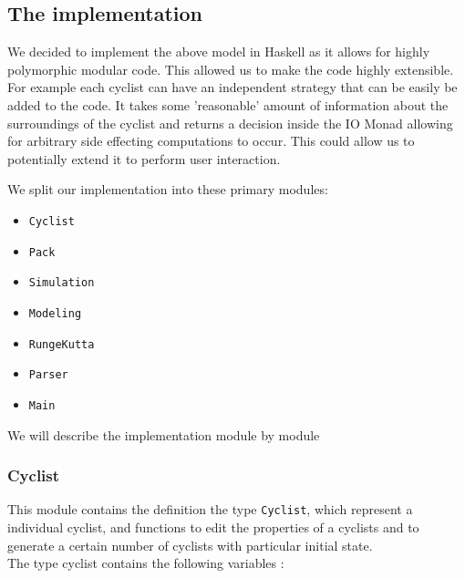 \documentclass[10pt, a4paper]{report}
\begin{document}
\subsection{The implementation}\label{subsec:impl}

We decided to implement the above model in Haskell as it allows for highly polymorphic modular code. This allowed us to make the code highly extensible. For example each cyclist can have an independent strategy that can be easily be added to the code. It takes some 'reasonable' amount of information about the surroundings of the cyclist and returns a decision inside the IO Monad allowing for arbitrary side effecting computations to occur. This could allow us to potentially extend it to perform user interaction. \par

We split our implementation into these primary modules:
\begin{itemize}
\item \texttt{Cyclist}
\item \texttt{Pack}
\item \texttt{Simulation}
\item \texttt{Modeling}
\item \texttt{RungeKutta}
\item \texttt{Parser}
\item \texttt{Main}
\end{itemize}

We will describe the implementation module by module

\subsubsection{Cyclist}

This module contains the definition the type \texttt{Cyclist}, which represent a individual cyclist, and functions to edit the properties of a cyclists and to generate a certain number of cyclists with particular initial state. \\

The type cyclist contains the following variables :
\end{document}
